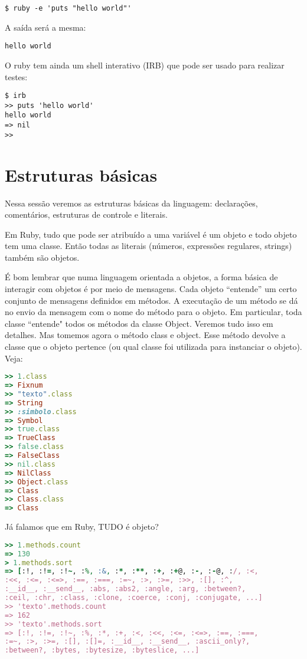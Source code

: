 \documentclass[serif,mathserif]{book}
\begin{document}
\begin{lstlisting}[style=BashInputStyle]
$ ruby -e 'puts "hello world"'
\end{lstlisting}

A saída será a mesma:

\begin{lstlisting}[style=BashOutputStyle]
hello world
\end{lstlisting}

O ruby tem ainda um shell interativo (IRB) que pode ser usado para realizar testes:


\begin{lstlisting}[style=BashInputStyle]
$ irb
>> puts 'hello world'
hello world
=> nil
>>
\end{lstlisting}

\chapter{Estruturas básicas}

Nessa sessão veremos as estruturas básicas da linguagem: declarações, comentários, estruturas de controle e literais. 

Em Ruby, tudo que pode ser atribuído a uma variável é um objeto e todo objeto tem uma classe. Então todas as literais 
(números, expressões regulares, strings) também são objetos.

É bom lembrar que numa linguagem orientada a objetos, a forma básica de interagir com 
objetos é por meio de mensagens. Cada objeto ``entende'' um certo conjunto de mensagens definidos em métodos.
 A executação de um método se dá no envio da mensagem 
com o nome do método para o objeto. Em particular, toda classe ``entende" todos os métodos da classe Object.
 Veremos tudo isso em detalhes. Mas tomemos agora 
o método class e object. Esse método devolve a classe que o objeto pertence (ou qual classe foi utilizada para instanciar o objeto). Veja:
 

\begin{lstlisting}[language=ruby]
>> 1.class
=> Fixnum
>> "texto".class
=> String
>> :simbolo.class
=> Symbol
>> true.class
=> TrueClass
>> false.class
=> FalseClass
>> nil.class
=> NilClass
>> Object.class
=> Class
>> Class.class
=> Class
\end{lstlisting}


Já falamos que em Ruby, TUDO é objeto?

\begin{lstlisting}[language=ruby]
>> 1.methods.count
=> 130
> 1.methods.sort
=> [:!, :!=, :!~, :%, :&, :*, :**, :+, :+@, :-, :-@, :/, :<, 
:<<, :<=, :<=>, :==, :===, :=~, :>, :>=, :>>, :[], :^, 
:__id__, :__send__, :abs, :abs2, :angle, :arg, :between?, 
:ceil, :chr, :class, :clone, :coerce, :conj, :conjugate, ...]
>> 'texto'.methods.count
=> 162
>> 'texto'.methods.sort
=> [:!, :!=, :!~, :%, :*, :+, :<, :<<, :<=, :<=>, :==, :===,
:=~, :>, :>=, :[], :[]=, :__id__, :__send__, :ascii_only?, 
:between?, :bytes, :bytesize, :byteslice, ...]
\end{lstlisting}
\end{document}
